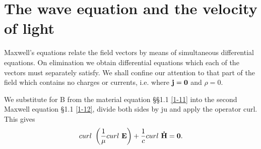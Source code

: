 \documentclass[lang=en,11pt]{elegantbook}
\begin{document}
	
	\section{The wave equation and the velocity of light}
	Maxwell's equations relate the field vectors by means of simultaneous differential equations. On elimination we obtain differential equations which each of the vectors must separately satisfy. We shall confine our attention to that part of the field which contains no charges or currents, i.e. where $\bf{j}=0$ and $\rho=0$.\par 
	We substitute for B from the material equation \S§1.1 \eqref{1-11} into the second Maxwell equation \S1.1 \eqref{1-12}, divide both sides by ju and apply the operator curl. This gives
	\setcounter{equation}{0}
	\begin{equation}
		curl\ \left(\frac{1}{\mu}curl\ \mathbf{E}\right)+\frac{1}{c}curl\ \bf{\dot{H}}=0.
		\label{2-1}
	\end{equation}
\end{document}
